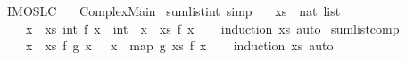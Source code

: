%
\begin{isabellebody}%
%
%
\isadelimdocument
%
\endisadelimdocument
%
\isatagdocument
%
\isamarkuptrue%
%
\endisatagdocument
{\isafolddocument}%
%
\isadelimdocument
%
\endisadelimdocument
%
\isadelimtheory
%
\endisadelimtheory
%
\isatagtheory
{}\isamarkupfalse%
\ IMO{\isacharunderscore}{}{}{}{}{\isacharunderscore}SL{\isacharunderscore}C{}\isanewline
\ \ \ Complex{\isacharunderscore}Main\isanewline
{}%
\endisatagtheory
{\isafoldtheory}%
%
\isadelimtheory
%
\endisadelimtheory
%
\isadelimdocument
%
\endisadelimdocument
%
\isatagdocument
%
\isamarkuptrue%
%
\endisatagdocument
{\isafolddocument}%
%
\isadelimdocument
%
\endisadelimdocument
{}\isamarkupfalse%
\ sum{\isacharunderscore}list{\isacharunderscore}int\ {\isacharbrackleft}simp{\isacharbrackright}{\isacharcolon}\isanewline
\ \ \ xs\ {\isacharcolon}{\isacharcolon}\ {\isachardoublequoteopen}nat\ list{\isachardoublequoteclose}\isanewline
\ \ \ {\isachardoublequoteopen}{\isacharparenleft}{\isasymSum}\ x\ {\isasymleftarrow}\ xs{\isachardot}\ int\ {\isacharparenleft}f\ x{\isacharparenright}{\isacharparenright}\ {\isacharequal}\ int\ {\isacharparenleft}{\isasymSum}\ x\ {\isasymleftarrow}\ xs{\isachardot}\ f\ x{\isacharparenright}{\isachardoublequoteclose}\isanewline
%
\isadelimproof
\ \ %
\endisadelimproof
%
\isatagproof
{}\isamarkupfalse%
\ {\isacharparenleft}induction\ xs{\isacharcomma}\ auto{\isacharparenright}%
\endisatagproof
{\isafoldproof}%
%
\isadelimproof
\isanewline
%
\endisadelimproof
\isanewline
{}\isamarkupfalse%
\ sum{\isacharunderscore}list{\isacharunderscore}comp{\isacharcolon}\isanewline
\ \ \ {\isachardoublequoteopen}{\isacharparenleft}{\isasymSum}\ x\ {\isasymleftarrow}\ xs{\isachardot}\ f\ {\isacharparenleft}g\ x{\isacharparenright}{\isacharparenright}\ {\isacharequal}\ {\isacharparenleft}{\isasymSum}\ x\ {\isasymleftarrow}\ map\ g\ xs{\isachardot}\ f\ x{\isacharparenright}{\isachardoublequoteclose}\isanewline
%
\isadelimproof
\ \ %
\endisadelimproof
%
\isatagproof
{}\isamarkupfalse%
\ {\isacharparenleft}induction\ xs{\isacharcomma}\ auto{\isacharparenright}%
\endisatagproof
{\isafoldproof}%
%

\end{isabellebody}
